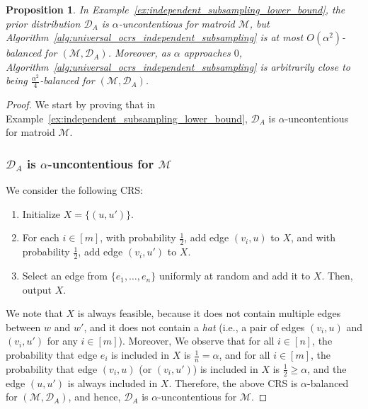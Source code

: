 \documentclass[11pt]{article}
\newcommand{\D}{\mathcal D}
\newcommand{\M}{{\mathcal M}}
\newtheorem{proposition}{Proposition}[section]
\begin{document}
\begin{proposition}\label{prop:independent_subsampling_lower_bound}
In Example~\ref{ex:independent_subsampling_lower_bound}, the prior distribution $\D_A$ is $\alpha$-uncontentious for matroid $\M$, but Algorithm~\ref{alg:universal_ocrs_independent_subsampling} is at most $O(\alpha^2)$-balanced for $(\M,\D_A)$. Moreover, as $\alpha$ approaches $0$, Algorithm~\ref{alg:universal_ocrs_independent_subsampling} is arbitrarily close to being $\frac{\alpha^2}{4}$-balanced for $(\M,\D_A)$.
\end{proposition}
\begin{proof}
We start by proving that in Example~\ref{ex:independent_subsampling_lower_bound}, $\D_A$ is $\alpha$-uncontentious for matroid $\M$.
\subsubsection*{$\D_A$ is $\alpha$-uncontentious for $\M$}
We consider the following CRS:
\begin{enumerate}[(1)]
    \item Initialize $X=\{(u,u')\}$.
    \item For each $i\in[m]$, with probability $\frac{1}{2}$, add edge $(v_i,u)$ to $X$, and with probability $\frac{1}{2}$, add edge $(v_i,u')$ to $X$.
    \item Select an edge from $\{e_1,\dots,e_n\}$ uniformly at random and add it to $X$. Then, output $X$.
\end{enumerate}
We note that $X$ is always feasible, because it does not contain multiple edges between $w$ and $w'$, and it does not contain a \emph{hat} (i.e., a pair of edges $(v_i,u)$ and $(v_i,u')$ for any $i\in[m]$). Moreover, We observe that for all $i\in[n]$, the probability that edge $e_i$ is included in $X$ is $\frac{1}{n}=\alpha$, and for all $i\in[m]$, the probability that edge $(v_i,u)$ (or $(v_i,u')$) is included in $X$ is $\frac{1}{2}\ge\alpha$, and the edge $(u,u')$ is always included in $X$. Therefore, the above CRS is $\alpha$-balanced for $(\M,\D_A)$, and hence, $\D_A$ is $\alpha$-uncontentious for $\M$.

\end{proof}
\end{document}
